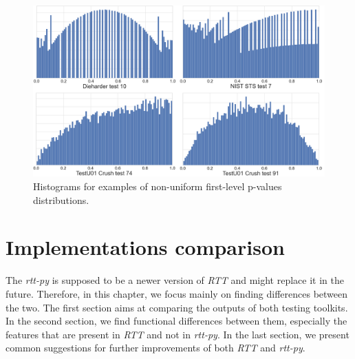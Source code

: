 \documentclass[
  digital,     %
  oneside,     %
  nosansbold,  %
  nocolorbold, %
  nolof,         %
  nolot,         %
]{fithesis4}
\begin{document}
\begin{figure}[h]
  \begin{center}
    \includegraphics[width=12.5cm]{figures/uniformity.png}
  \end{center}
  \caption{Histograms for examples of non-uniform first-level p-values distributions.}
  \label{fig:uniforms}
\end{figure}






\chapter{Implementations comparison} \label{chap:comparison}

The \emph{rtt-py} is supposed to be a newer version of \emph{RTT} and might replace it in the future. Therefore, in this chapter, we focus mainly on finding differences between the two. The first section aims at comparing the outputs of both testing toolkits. In the second section, we find functional differences between them, especially the features that are present in \emph{RTT} and not in \emph{rtt-py}. In the last section, we present common suggestions for further improvements of both \emph{RTT} and \emph{rtt-py}. 
\end{document}
